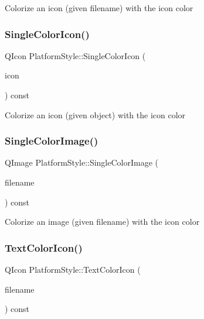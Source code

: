 Colorize an icon (given filename) with the icon color \mbox{\label{class_platform_style_af2ff6ee24cd5745b34a945afecdf41f7}} 
\subsubsection{\texorpdfstring{Single\+Color\+Icon()}{SingleColorIcon()}\hspace{0.1cm}{\footnotesize\ttfamily [2/2]}}
{\footnotesize\ttfamily Q\+Icon Platform\+Style\+::\+Single\+Color\+Icon (\begin{DoxyParamCaption}\item[{const Q\+Icon \&}]{icon }\end{DoxyParamCaption}) const}

Colorize an icon (given object) with the icon color \mbox{\label{class_platform_style_adecebc4670880700203340d322351f89}} 
\subsubsection{\texorpdfstring{Single\+Color\+Image()}{SingleColorImage()}}
{\footnotesize\ttfamily Q\+Image Platform\+Style\+::\+Single\+Color\+Image (\begin{DoxyParamCaption}\item[{const Q\+String \&}]{filename }\end{DoxyParamCaption}) const}

Colorize an image (given filename) with the icon color \mbox{\label{class_platform_style_ac3c91893b60a84a98155b7b9603918bd}} 
\subsubsection{\texorpdfstring{Text\+Color\+Icon()}{TextColorIcon()}\hspace{0.1cm}{\footnotesize\ttfamily [1/2]}}
{\footnotesize\ttfamily Q\+Icon Platform\+Style\+::\+Text\+Color\+Icon (\begin{DoxyParamCaption}\item[{const Q\+String \&}]{filename }\end{DoxyParamCaption}) const}

